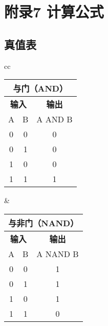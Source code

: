 \newpage

\section{附录7 计算公式}

\subsection{真值表}

\begin{tabular}{cc}%
\begin{tabular}{|c|c|c|}
	\hline
	\multicolumn{3}{|c|}{\textbf{与门（AND）}} \\
	\hline
	\multicolumn{2}{|c|}{\textbf{输入}} & \textbf{输出} \\
	\hline
	A & B & A AND B \\
	\hline
	0 & 0 & 0 \\
	\hline
	0 & 1 & 0 \\
	\hline
	1 & 0 & 0 \\
	\hline
	1 & 1 & 1 \\
	\hline
\end{tabular} &
\begin{tabular}{|c|c|c|}
	\hline
	\multicolumn{3}{|c|}{\textbf{与非门（NAND）}} \\
	\hline
	\multicolumn{2}{|c|}{\textbf{输入}} & \textbf{输出} \\
	\hline
	A & B & A NAND B \\
	\hline
	0 & 0 & 1 \\
	\hline
	0 & 1 & 1 \\
	\hline
	1 & 0 & 1 \\
	\hline
	1 & 1 & 0 \\
	\hline
\end{tabular} \tabularnewline
\end{tabular}

\bigskip

